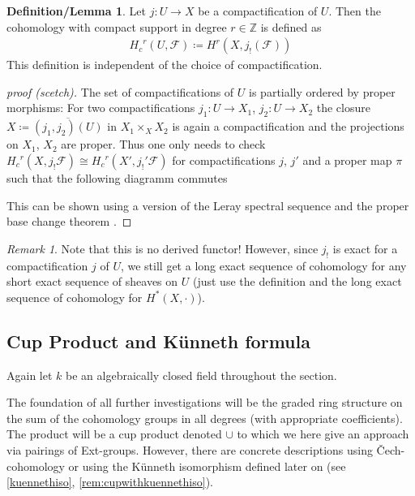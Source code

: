 \documentclass[english]{scrartcl}
\theoremstyle{definition}
\newtheorem{DefLem}[Def]{Definition/Lemma}
\theoremstyle{remark}
\newtheorem{Rem}[Def]{Remark}
\newcommand*{\Z}{\mathds{Z}}
\newcommand*{\F}{\mathcal{F}} %
\newcommand*{\Hc}{{H_c}} %
\begin{document}
\begin{DefLem}\label{def:cptcohomology}
  Let $j\colon U\to X$ be a compactification of $U$. Then the
  cohomology with compact support in degree $r\in\Z$ is defined as
  \begin{gather*}
    \Hc^r(U,\F) \coloneqq H^r(X,j_!(\F))
  \end{gather*}
  This definition is independent of the choice of compactification.
  \begin{proof}[proof (scetch)]
    The set of compactifications of $U$ is partially ordered by proper
    morphisms:
    For two compactifications $j_1\colon U\to X_1$,
    $j_2\colon U\to X_2$ the closure
    $X\coloneqq\overline{(j_1,j_2)(U)}$ in $X_1\times_X X_2$ is again
    a compactification and the projections on $X_1$, $X_2$ are proper.
    Thus one only needs to check $\Hc^r(X,j_!\F)\cong\Hc^r(X',j_!'\F)$
    for compactifications $j$, $j'$ and a proper map $\pi$ such that
    the following diagramm commutes
    \begin{center}
    \end{center}
    This can be shown using a version of the Leray spectral
    sequence and the proper base change theorem
    \cite[][Thm. I.18.2]{milne}.
  \end{proof}
\end{DefLem}

\begin{Rem}
  Note that this is no derived functor!
  However, since $j_!$ is exact for a compactification $j$ of $U$, we
  still get a long exact sequence of cohomology for any short exact
  sequence of sheaves on $U$
  (just use the definition and the long exact sequence of cohomology for
  $H^*(X,\cdot)$).
\end{Rem}

\subsection{Cup Product and Künneth formula}
Again let $k$ be an algebraically closed field throughout the
section.

The foundation of all further investigations will be the graded
ring structure on the sum of the cohomology groups in all degrees
(with appropriate coefficients). The product will be a cup product
denoted $\cup$ to which we here give an approach via pairings of
Ext-groups. 
However, there are concrete descriptions using Čech-cohomology
\cite[see][Chap.~I.10 and Chap.~I.22, Cup-products]{milne}
or using the Künneth isomorphism defined later on (see
\autoref{kuennethiso}, \autoref{rem:cupwithkuennethiso}).
\end{document}
